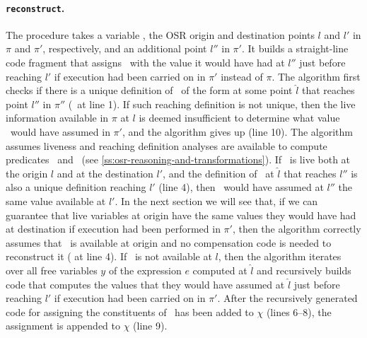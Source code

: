 \paragraph*{\texttt{reconstruct}.} The procedure  takes a variable \wx, the OSR origin and destination points $l$ and $l'$ in $\pi$ and $\pi'$, respectively, and an additional point $l''$ in $\pi'$. It builds a straight-line code fragment that assigns \wx\ with the value it would have had at $l''$ just before reaching $l'$ if execution had been carried on in $\pi'$ instead of $\pi$. The algorithm first checks if there is a unique definition of \wx\ of the form  at some point $\hat{l}$ that reaches point $l''$ in $\pi''$ (\ureachdef\ at line 1). If such reaching definition is not unique, then the live information available in $\pi$ at $l$ is deemed insufficient to determine what value \wx\ would have assumed in $\pi'$, and the algorithm gives up (line 10). %
The algorithm assumes liveness and reaching definition analyses are available to compute predicates \live\ and \ureachdef\ (see \mysection\ref{ss:osr-reasoning-and-transformations}). If \wx\ is live both at the origin $l$ and at the destination $l'$, and the definition of \wx\ at $\hat{l}$ that reaches $l''$ is also a unique definition reaching $l'$ (line 4), then \wx\ would have assumed at $l''$ the same value available at $l'$. In the next section we will see that, if we can guarantee that live variables at origin have the same values they would have had at destination if execution had been performed in $\pi'$, then the algorithm correctly assumes that \wx\ is available at origin and no compensation code is needed to reconstruct it ( at line 4). If \wx\ is not available at $l$, then the algorithm iterates over all free variables $y$ of the expression $e$ computed at $\hat{l}$ and recursively builds code that computes the values that they would have assumed at $\hat{l}$ just before reaching $l'$ if execution had been carried on in $\pi'$. After the recursively generated code for assigning the constituents of \we\ has been added to $\chi$ (lines 6--8), the assignment  is appended to $\chi$ (line 9).
